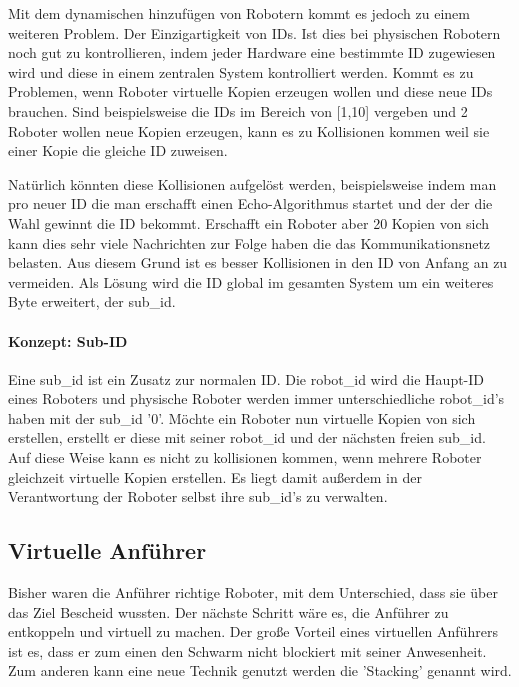 Mit dem dynamischen hinzufügen von Robotern kommt es jedoch zu einem weiteren Problem. Der Einzigartigkeit von IDs. Ist dies bei physischen Robotern noch gut zu kontrollieren, indem jeder Hardware eine bestimmte ID zugewiesen wird und diese in einem zentralen System kontrolliert werden. Kommt es zu Problemen, wenn Roboter virtuelle Kopien erzeugen wollen und diese neue IDs brauchen. Sind beispielsweise die IDs im Bereich von [1,10] vergeben und 2 Roboter wollen neue Kopien erzeugen, kann es zu Kollisionen kommen weil sie einer Kopie die gleiche ID zuweisen.

Natürlich könnten diese Kollisionen aufgelöst werden, beispielsweise indem man pro neuer ID die man erschafft einen Echo-Algorithmus startet und der der die Wahl gewinnt die ID bekommt. Erschafft ein Roboter aber 20 Kopien von sich kann dies sehr viele Nachrichten zur Folge haben die das Kommunikationsnetz belasten. Aus diesem Grund ist es besser Kollisionen in den ID von Anfang an zu vermeiden. Als Lösung wird die ID global im gesamten System um ein weiteres Byte erweitert, der sub\_id.

\paragraph*{Konzept: Sub-ID}
Eine sub\_id ist ein Zusatz zur normalen ID. Die robot\_id wird die Haupt-ID eines Roboters und physische Roboter werden immer unterschiedliche robot\_id's haben mit der sub\_id '0'. Möchte ein Roboter nun virtuelle Kopien von sich erstellen, erstellt er diese mit seiner robot\_id und der nächsten freien sub\_id. Auf diese Weise kann es nicht zu kollisionen kommen, wenn mehrere Roboter gleichzeit virtuelle Kopien erstellen. Es liegt damit außerdem in der Verantwortung der Roboter selbst ihre sub\_id's zu verwalten.





\subsection{Virtuelle Anführer}

Bisher waren die Anführer richtige Roboter, mit dem Unterschied, dass sie über das Ziel Bescheid wussten. Der nächste Schritt wäre es, die Anführer zu entkoppeln und virtuell zu machen\cite{RobotLeaderVirtual}.
Der große Vorteil eines virtuellen Anführers ist es, dass er zum einen den Schwarm nicht blockiert mit seiner Anwesenheit. Zum anderen kann eine neue Technik genutzt werden die 'Stacking' genannt wird.

